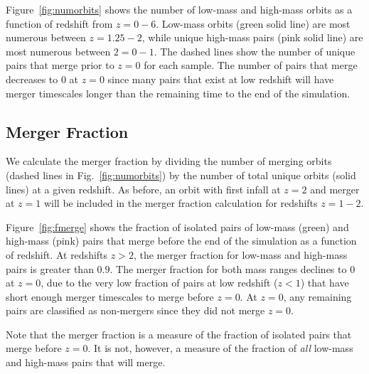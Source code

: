 \documentclass[twocolumn,linenumbers]{aastex631}
\begin{document}
Figure~\ref{fig:numorbits} shows the number of low-mass and high-mass orbits as a function of redshift from $z=0-6$. 
Low-mass orbits (green solid line) are most numerous between $z=1.25-2$, while unique high-mass pairs (pink solid line) are most numerous between $2=0-1$.
The dashed lines show the number of unique pairs that merge prior to $z=0$ for each sample. 
The number of pairs that merge decreases to 0 at $z=0$ since 
many pairs that exist at low redshift will have merger timescales longer than the remaining time to the end of the simulation. 


\subsection{Merger Fraction}
We calculate the merger fraction by dividing the number of merging orbits (dashed lines in Fig.~\ref{fig:numorbits}) by the number of total unique orbits (solid lines) at a given redshift. 
As before, an orbit with first infall at $z=2$ and merger at $z=1$ will be included in the merger fraction calculation for redshifts $z=1-2$.

Figure~\ref{fig:fmerge} shows the fraction of isolated pairs of low-mass (green) and high-mass (pink) pairs that merge before the end of the simulation as a function of redshift. 
At redshifts $z>2$, the merger fraction for low-mass and high-mass pairs is greater than $0.9$.
The merger fraction for both mass ranges declines to $0$ at $z=0$, due to the very low fraction of pairs at low redshift ($z<1$) that have short enough merger timescales to merge before $z=0$. At $z=0$, any remaining pairs are classified as non-mergers since they did not merge \textit{$z=0$}.

Note that the merger fraction is a measure of the fraction of isolated pairs that merge before $z=0$. 
It is not, however, a measure of the fraction of \textit{all} low-mass and high-mass pairs that will merge. 
\end{document}

